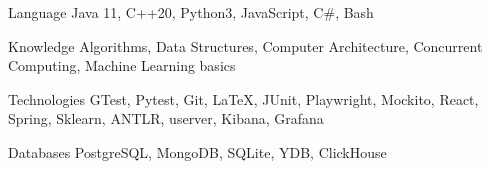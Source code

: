 

\begin{cvskills}

  \cvskill
    {Language} %
    {Java 11, C++20, Python3, JavaScript, C\#, Bash} %

  \cvskill
    {Knowledge} %
    {Algorithms, Data Structures, Computer Architecture, Concurrent Computing, Machine Learning basics} %

  \cvskill
    {Technologies} %
    {GTest, Pytest, Git, \LaTeX, JUnit, Playwright, Mockito, React, Spring, Sklearn, ANTLR, userver, Kibana, Grafana} %

  \cvskill
    {Databases} %
    {PostgreSQL, MongoDB, SQLite, YDB, ClickHouse} %

\end{cvskills}
